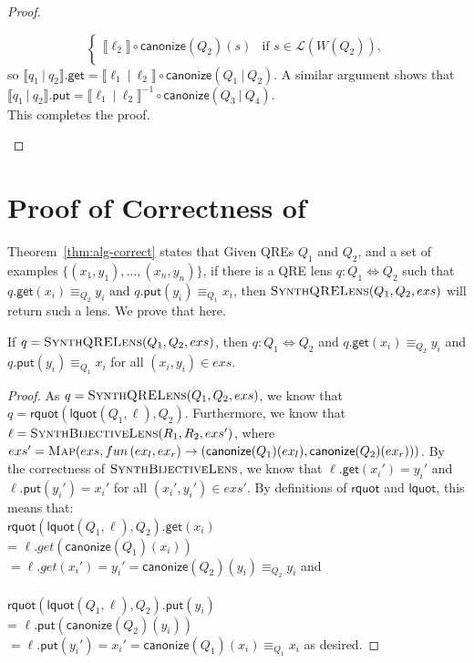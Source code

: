 \documentclass[acmsmall,review,anonymous]{acmart}
\newcommand{\codefont}[1]{\ensuremath{\mathsf{#1}}}
\newcommand{\kw}[1]{\codefont{#1}}
\newcommand{\sep}{\ensuremath{\ | \ }}
\newcommand{\canonize}{\ensuremath{\kw{canonize}}}
\newcommand{\get}{\ensuremath{\kw{get}}}
\newcommand{\lput}{\ensuremath{\kw{put}}}
\newcommand{\lquot}{\ensuremath{\kw{lquot}}}
\newcommand{\rquot}{\ensuremath{\kw{rquot}}}
\begin{document}
\begin{proof}
\begin{enumerate}
$$\begin{cases}
\llbracket \ell_2 \rrbracket \circ
\canonize(Q_2) (s) & \text{if } s \in \mathcal{L}(W(Q_2)),\\
\end{cases}$$
so $\llbracket q_1 \sep q_2 \rrbracket.\get = \llbracket \ell_1 \sep
\ell_2 \rrbracket \circ \canonize(Q_1 \sep Q_2)$. A similar argument shows
that $\llbracket q_1 \sep q_2 \rrbracket.\lput = \llbracket \ell_1 \sep
\ell_2 \rrbracket^{-1} \circ \canonize(Q_3 \sep Q_4)$.\\
This completes the proof. 
\end{enumerate}
\end{proof}

\section{Proof of Correctness of }
Theorem~\ref{thm:alg-correct} states that
  Given QREs $Q_1$ and $Q_2$, and a set of examples
  $\{(x_1,y_1),\ldots,(x_n,y_n)\}$, if there is a QRE lens $q : Q_1
  \Leftrightarrow Q_2$ such that $q.\get(x_i) \equiv_{Q_2} y_i \text{ and }
q.\lput(y_i) \equiv_{Q_1} x_i$, then $\textproc{SynthQRELens}(Q_1,Q_2,exs)$ will
return such a lens.  We prove that here.

\begin{lemma}
  If $q = \textproc{SynthQRELens}(Q_1,Q_2,exs)$, then $q : Q_1 \Leftrightarrow
  Q_2$ and $q.\get(x_i) \equiv_{Q_2} y_i$  and 
$q.\lput(y_i) \equiv_{Q_1} x_i$ for all $(x_i,y_i)\in exs$.
\end{lemma}
\begin{proof}
  As $q = \textproc{SynthQRELens}(Q_1,Q_2,exs)$, we know that $q =
  \rquot(\lquot(Q_1, \ell), Q_2)$. Furthermore, we know that $\ell =
  \Call{SynthBijectiveLens}{R_1,R_2,exs'}$, where $exs' = \Call{Map}{exs,fun \,
    (ex_l,ex_r) \to (\canonize(Q_1)(ex_l),\canonize(Q_2)(ex_r))}$. By the correctness of
  $\textproc{SynthBijectiveLens}$, we know that $\ell.\get(x_i') = y_i'$ and
  $\ell.\lput(y_i') = x_i'$ for all $(x_i',y_i')\in exs'$. By definitions of
  $\rquot$ and $\lquot$, this means that:\\
$\rquot(\lquot(Q_1, \ell),
  Q_2).\get(x_i)$\\
 = $\ell.get(\canonize(Q_1)(x_i))$\\ $= \ell.get(x_i') = y_i' =
  \canonize(Q_2)(y_i) \equiv_{Q_2} y_i$ and\\
\\
$\rquot(\lquot(Q_1, \ell),
  Q_2).\lput(y_i)$\\
 = $\ell.\lput(\canonize(Q_2)(y_i))$\\ $= \ell.\lput(y_i') = x_i' =
  \canonize(Q_1)(x_i) \equiv_{Q_1} x_i$ as desired.
\end{proof}
\end{document}
